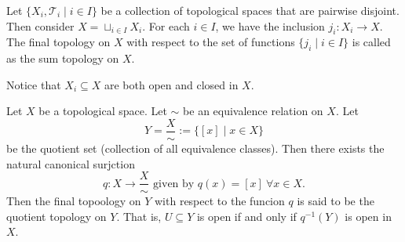 \begin{definition}
    Let $\{X_{i},\mathcal{T}_{i}\mid i\in I\}$ be a collection of topological spaces that are pairwise disjoint. Then consider $X=\sqcup_{i\in I}X_{i}$. For each $i\in I$, we have the inclusion $j_{i}:X_{i}\to X$. The final topology on $X$ with respect to the set of functions $\{j_{i}\mid i\in I\}$ is called as the sum topology on $X$.
\end{definition}
\vspace{0.4cm}
\begin{note}
    Notice that $X_{i}\subseteq X$ are both open and closed in $X$.
\end{note}
\vspace{0.4cm}
\begin{definition}
    Let $X$ be a topological space. Let $\sim$ be an equivalence relation on $X$. Let $$Y=\frac{X}{\sim}:=\{[x]\mid x\in X\}$$ be the quotient set (collection of all equivalence classes). Then there exists the natural canonical surjction $$q:X\to \frac{X}{\sim}\text{ given by }q(x)=[x]~\forall x\in X.$$ 
    Then the final topoology on $Y$ with respect to the funcion $q$ is said to be the quotient topology on $Y$.
    That is, $U\subseteq Y$ is open if and only if $q^{-1}(Y)$ is open in $X$.
\end{definition}

